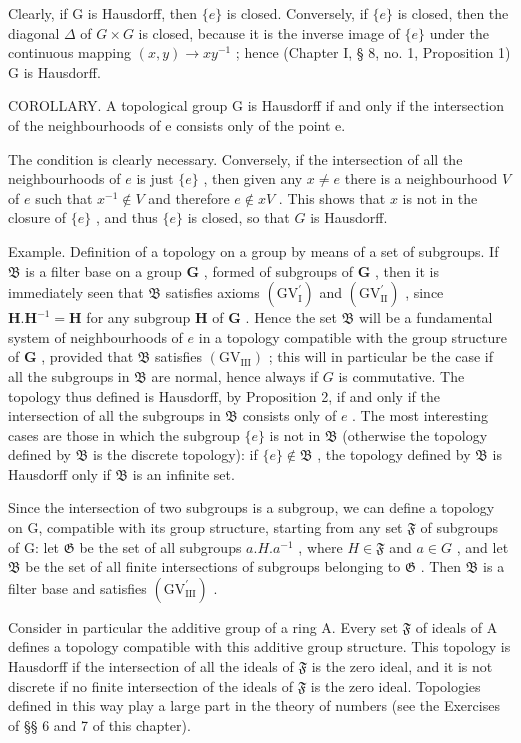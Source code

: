 Clearly, if G is Hausdorff, then \(\{e\}\) is closed. Conversely, if \(\{e\}\) is closed, then the diagonal \(\Delta\) of \(G \times G\) is closed, because it is the inverse image of \(\{e\}\) under the continuous mapping \((x, y) \to xy^{-1}\) ; hence (Chapter I, § 8, no. 1, Proposition 1) G is Hausdorff.

COROLLARY. A topological group G is Hausdorff if and only if the intersection of the neighbourhoods of e consists only of the point e.

The condition is clearly necessary. Conversely, if the intersection of all the neighbourhoods of \(e\) is just \(\{e\}\) , then given any \(x \neq e\) there is a neighbourhood \(V\) of \(e\) such that \(x^{-1} \notin V\) and therefore \(e \notin xV\) . This shows that \(x\) is not in the closure of \(\{e\}\) , and thus \(\{e\}\) is closed, so that \(G\) is Hausdorff.

Example. Definition of a topology on a group by means of a set of subgroups. If \(\mathfrak{B}\) is a filter base on a group \(\mathbf{G}\) , formed of subgroups of \(\mathbf{G}\) , then it is immediately seen that \(\mathfrak{B}\) satisfies axioms \((\mathrm{GV}_{\mathrm{I}}^{\prime})\) and \((\mathrm{GV}_{\mathrm{II}}^{\prime})\) , since \(\mathbf{H}.\mathbf{H}^{-1} = \mathbf{H}\) for any subgroup \(\mathbf{H}\) of \(\mathbf{G}\) . Hence the set \(\mathfrak{B}\) will be a fundamental system of neighbourhoods of \(e\) in a topology compatible with the group structure of \(\mathbf{G}\) , provided that \(\mathfrak{B}\) satisfies \((\mathrm{GV}_{\mathrm{III}})\) ; this will in particular be the case if all the subgroups in \(\mathfrak{B}\) are normal, hence always if \(G\) is commutative. The topology thus defined is Hausdorff, by Proposition 2, if and only if the intersection of all the subgroups in \(\mathfrak{B}\) consists only of \(e\) . The most interesting cases are those in which the subgroup \(\{e\}\) is not in \(\mathfrak{B}\) (otherwise the topology defined by \(\mathfrak{B}\) is the discrete topology): if \(\{e\} \notin \mathfrak{B}\) , the topology defined by \(\mathfrak{B}\) is Hausdorff only if \(\mathfrak{B}\) is an infinite set.

Since the intersection of two subgroups is a subgroup, we can define a topology on G, compatible with its group structure, starting from any set \(\mathfrak{F}\) of subgroups of G: let \(\mathfrak{G}\) be the set of all subgroups \(a.H.a^{-1}\) , where \(H\in\mathfrak{F}\) and \(a\in G\) , and let \(\mathfrak{B}\) be the set of all finite intersections of subgroups belonging to \(\mathfrak{G}\) . Then \(\mathfrak{B}\) is a filter base and satisfies \((\mathrm{GV}_{\mathrm{III}}^{\prime})\) .

Consider in particular the additive group of a ring A. Every set \(\mathfrak{F}\) of ideals of A defines a topology compatible with this additive group structure. This topology is Hausdorff if the intersection of all the ideals of \(\mathfrak{F}\) is the zero ideal, and it is not discrete if no finite intersection of the ideals of \(\mathfrak{F}\) is the zero ideal. Topologies defined in this way play a large part in the theory of numbers (see the Exercises of §§ 6 and 7 of this chapter).

